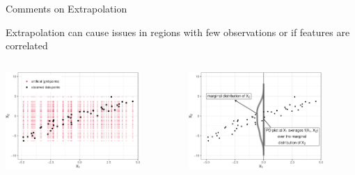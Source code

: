 \documentclass[11pt,compress,t,notes=noshow, aspectratio=169, xcolor=table]{beamer}
\begin{document}
\begin{frame}{Comments on Extrapolation}


Extrapolation can cause issues in regions with few observations or if features are correlated
 
\begin{columns}[T]
\begin{column}{0.5\textwidth}
\centering
\includegraphics[width=0.8\textwidth]{figure/ale_scatter_grid}
\end{column}
\begin{column}{0.5\textwidth}
\centering
\includegraphics[width=0.8\textwidth]{figure/ale_pdplot}
\end{column}
\end{columns}


\end{frame}
\end{document}
